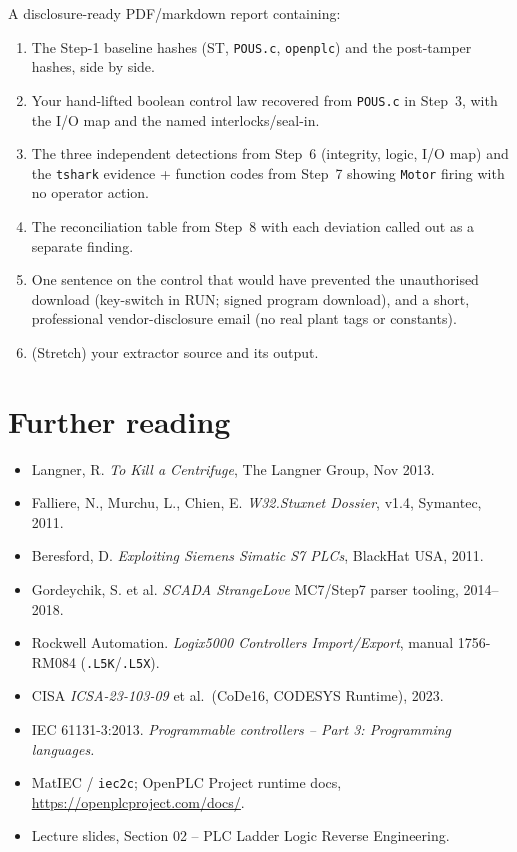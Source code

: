 \documentclass[11pt,a4paper]{article}
\begin{document}
\begin{deliverbox}
A disclosure-ready PDF/markdown report containing:
\begin{enumerate}\setlength{\itemsep}{1pt}
  \item The Step-1 baseline hashes (ST, \texttt{POUS.c}, \texttt{openplc})
        and the post-tamper hashes, side by side.
  \item Your hand-lifted boolean control law recovered from \texttt{POUS.c}
        in Step~3, with the I/O map and the named interlocks/seal-in.
  \item The three independent detections from Step~6 (integrity, logic,
        I/O map) and the \texttt{tshark} evidence + function codes from
        Step~7 showing \texttt{Motor} firing with no operator action.
  \item The reconciliation table from Step~8 with each deviation called out
        as a separate finding.
  \item One sentence on the control that would have prevented the
        unauthorised download (key-switch in RUN; signed program download),
        and a short, professional vendor-disclosure email (no real plant
        tags or constants).
  \item (Stretch) your extractor source and its output.
\end{enumerate}
\end{deliverbox}

\section*{Further reading}

\begin{itemize}\setlength{\itemsep}{1pt}
  \item Langner, R. \emph{To Kill a Centrifuge}, The Langner Group, Nov 2013.
  \item Falliere, N., Murchu, L., Chien, E. \emph{W32.Stuxnet Dossier}, v1.4, Symantec, 2011.
  \item Beresford, D. \emph{Exploiting Siemens Simatic S7 PLCs}, BlackHat USA, 2011.
  \item Gordeychik, S. et al. \emph{SCADA StrangeLove} MC7/Step7 parser tooling, 2014--2018.
  \item Rockwell Automation. \emph{Logix5000 Controllers Import/Export}, manual 1756-RM084 (\texttt{.L5K}/\texttt{.L5X}).
  \item CISA \emph{ICSA-23-103-09} et al.\ (CoDe16, CODESYS Runtime), 2023.
  \item IEC 61131-3:2013. \emph{Programmable controllers -- Part 3: Programming languages.}
  \item MatIEC / \texttt{iec2c}; OpenPLC Project runtime docs, \url{https://openplcproject.com/docs/}.
  \item Lecture slides, Section 02 -- PLC Ladder Logic Reverse Engineering.
\end{itemize}
\end{document}
